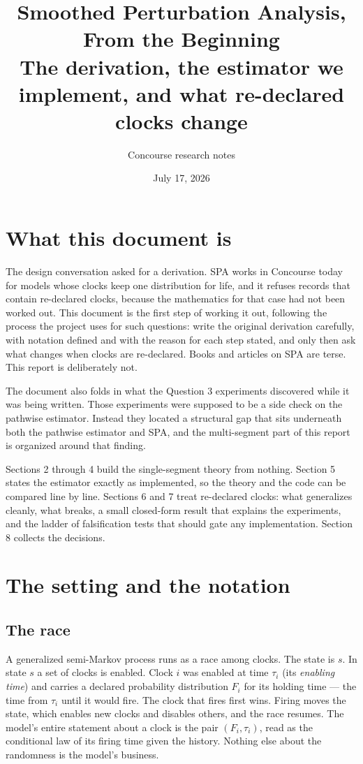 \documentclass[11pt]{article}
\title{Smoothed Perturbation Analysis, From the Beginning\\
\large The derivation, the estimator we implement, and what re-declared
clocks change}
\author{Concourse research notes}
\date{July 17, 2026}
\begin{document}
\maketitle
\tableofcontents

\section{What this document is}

The design conversation asked for a derivation. SPA works in Concourse
today for models whose clocks keep one distribution for life, and it
refuses records that contain re-declared clocks, because the mathematics
for that case had not been worked out. This document is the first step of
working it out, following the process the project uses for such
questions: write the original derivation carefully, with notation defined
and with the reason for each step stated, and only then ask what changes
when clocks are re-declared. Books and articles on SPA are terse. This
report is deliberately not.

The document also folds in what the Question 3 experiments discovered
while it was being written. Those experiments were supposed to be a
side check on the pathwise estimator. Instead they located a structural
gap that sits underneath both the pathwise estimator and SPA, and the
multi-segment part of this report is organized around that finding.

Sections 2 through 4 build the single-segment theory from nothing.
Section 5 states the estimator exactly as implemented, so the theory and
the code can be compared line by line. Sections 6 and 7 treat re-declared
clocks: what generalizes cleanly, what breaks, a small closed-form result
that explains the experiments, and the ladder of falsification tests that
should gate any implementation. Section 8 collects the decisions.

\section{The setting and the notation}

\subsection{The race}

A generalized semi-Markov process runs as a race among clocks. The state
is $s$. In state $s$ a set of clocks is enabled. Clock $i$ was enabled at
time $\tau_i$ (its \emph{enabling time}) and carries a declared
probability distribution $F_i$ for its holding time --- the time from
$\tau_i$ until it would fire. The clock that fires first wins. Firing
moves the state, which enables new clocks and disables others, and the
race resumes. The model's entire statement about a clock is the pair
$(F_i, \tau_i)$, read as the conditional law of its firing time given the
history. Nothing else about the randomness is the model's business.
\end{document}
